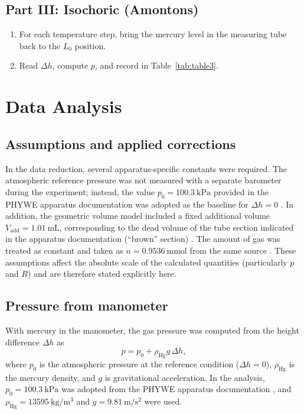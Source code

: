 \documentclass[journal]{IEEEtran}
\begin{document}
\subsection{Part III: Isochoric (Amontons)}
\begin{enumerate}
	\item For each temperature step, bring the mercury level in the measuring tube back to the $L_0$ position.
	\item Read $\Delta h$, compute $p$, and record in Table~\ref{tab:table3}.
\end{enumerate}

\section{Data Analysis}

\subsection{Assumptions and applied corrections}
In the data reduction, several apparatus-specific constants were required. The atmospheric reference pressure was not measured with a separate barometer during the experiment; instead, the value $p_0=\SI{100.3}{\kilo\pascal}$ provided in the PHYWE apparatus documentation was adopted as the baseline for $\Delta h=0$ \cite{phywe_manual}. In addition, the geometric volume model included a fixed additional volume $V_{\mathrm{add}}=\SI{1.01}{\milli\liter}$, corresponding to the dead volume of the tube section indicated in the apparatus documentation (``brown'' section) \cite{phywe_manual}. The amount of gas was treated as constant and taken as $n=\SI{0.9536}{\milli\mole}$ from the same source \cite{phywe_manual}. These assumptions affect the absolute scale of the calculated quantities (particularly $p$ and $R$) and are therefore stated explicitly here.

\subsection{Pressure from manometer}
With mercury in the manometer, the gas pressure was computed from the height difference $\Delta h$ as
\begin{equation}
	p = p_0 + \rho_{\mathrm{Hg}} g\,\Delta h,
	\label{eq:manometer}
\end{equation}
where $p_0$ is the atmospheric pressure at the reference condition ($\Delta h=0$), $\rho_{\mathrm{Hg}}$ is the mercury density, and $g$ is gravitational acceleration. In the analysis, $p_0=\SI{100.3}{\kilo\pascal}$ was adopted from the PHYWE apparatus documentation \cite{phywe_manual}, and $\rho_{\mathrm{Hg}}=\SI{13595}{\kilogram\per\meter\cubed}$ and $g=\SI{9.81}{\meter\per\second\squared}$ were used.
\end{document}
